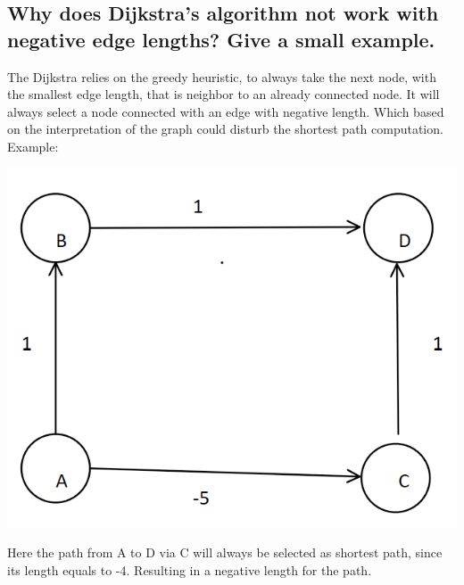 \documentclass[runningheads]{llncs}
\begin{document}
\subsection*{Why does Dijkstra's algorithm not work with negative edge lengths? Give a small example.}
The Dijkstra relies on the greedy heuristic, to always take the next node, with the smallest edge length, that is neighbor to an already connected node. It will always select a node connected with an edge with negative length. Which based on
the interpretation of the graph could disturb the shortest path computation. Example:
\begin{center}
    \includegraphics{./resources/graph_0}
\end{center}
Here the path from A to D via C will always be selected as shortest path, since its length equals to -4. Resulting in a negative length for the path.
\end{document}

